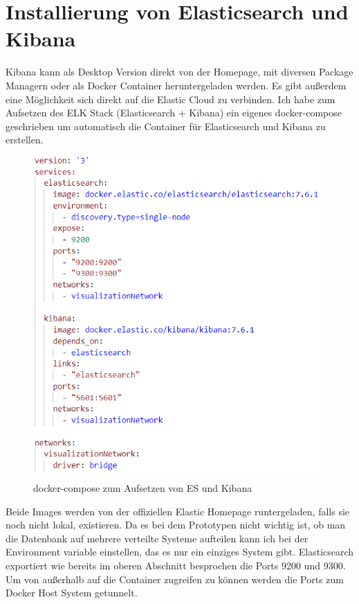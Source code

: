 \section{Installierung von Elasticsearch und Kibana}
Kibana kann als Desktop Version direkt von der Homepage, mit diversen Package Managern oder als Docker Container heruntergeladen werden. Es gibt außerdem eine Möglichkeit sich direkt auf die Elastic Cloud zu verbinden. Ich habe zum Aufsetzen des ELK Stack (Elasticsearch + Kibana) ein eigenes docker-compose geschrieben um automatisch die Container für Elasticsearch und Kibana zu erstellen.
\begin{figure}[H]
    \centering
    \includegraphics{images/docker-compose_kibana.PNG}
    \caption{docker-compose zum Aufsetzen von ES und Kibana}
    \label{iziellen Elastic Homepage runtergeladen falls sie noch nicht lokalmg:docker-compose_kibana}
\end{figure}
Beide Images werden von der offiziellen Elastic Homepage runtergeladen, falls sie noch nicht lokal, existieren.
Da es bei dem Prototypen nicht wichtig ist, ob man die Datenbank auf mehrere verteilte Systeme aufteilen kann ich bei der Environment variable einstellen, das es nur ein einziges System gibt.
Elasticsearch exportiert wie bereits im oberen Abschnitt besprochen die Ports 9200 und 9300. Um von außerhalb auf die Container zugreifen zu können werden die Ports zum Docker Host System getunnelt.
